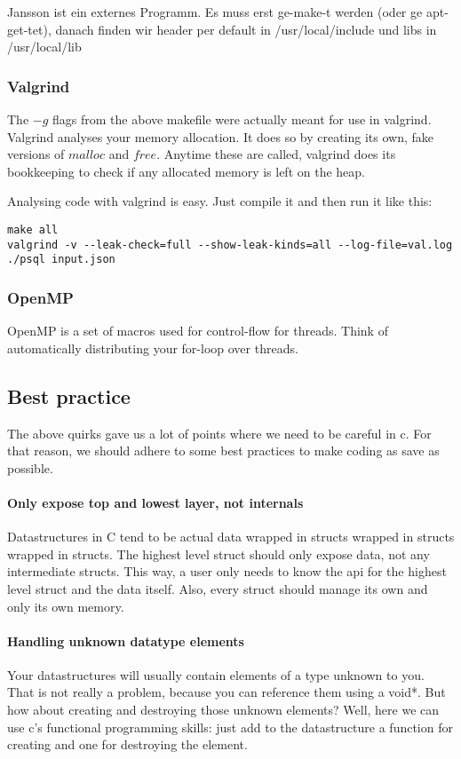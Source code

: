 Jansson ist ein externes Programm. Es muss erst ge-make-t werden (oder ge apt-get-tet), danach finden wir header per default in /usr/local/include und libs in /usr/local/lib

\subsubsection{Valgrind}
The $-g$ flags from the above makefile were actually meant for use in valgrind. 
Valgrind analyses your memory allocation. It does so by creating its own, fake versions of $malloc$ and $free$. Anytime these are called, valgrind does its bookkeeping to check if any allocated memory is left on the heap.

Analysing code with valgrind is easy. Just compile it and then run it like this:
\begin{lstlisting}
make all
valgrind -v --leak-check=full --show-leak-kinds=all --log-file=val.log ./psql input.json
\end{lstlisting}

\subsubsection{OpenMP}
OpenMP is a set of macros used for control-flow for threads. Think of automatically distributing your for-loop over threads.



\subsection{Best practice}

The above quirks gave us a lot of points where we need to be careful in c. 
For that reason, we should adhere to some best practices to make coding as save as possible.

\paragraph{Only expose top and lowest layer, not internals} Datastructures in C tend to be actual data wrapped in structs wrapped in structs wrapped in structs. The highest level struct should only expose data, not any intermediate structs. This way, a user only needs to know the api for the highest level struct and the data itself. Also, every struct should manage its own and only its own memory.

\paragraph{Handling unknown datatype elements} Your datastructures will usually contain elements of a type unknown to you. That is not really a problem, because you can reference them using a void*. But how about creating and destroying those unknown elements? Well, here we can use c's functional programming skills: just add to the datastructure a function for creating and one for destroying the element.


